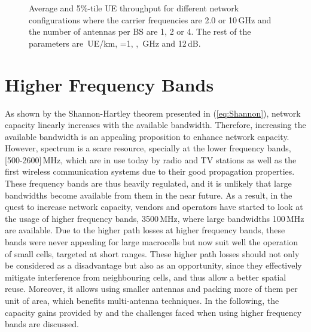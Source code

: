 \documentclass{IEEEtran}
\begin{document}
\begin{figure*}[t]
  \centering
  \caption{Average and 5\%-tile UE throughput for different network configurations where the carrier frequencies are 2.0 or 10\,GHz
  and the number of antennas per \ac{BS} are 1, 2 or 4.
  The rest of the parameters are \,UE/km, =1, , \,GHz and 12\,dB.}
  \label{fig:throughputAllAnt}
\end{figure*}



\section{Higher Frequency Bands}
\label{Sec:higherFrequecnyBands}

As shown by the Shannon-Hartley theorem presented in (\ref{eq:Shannon}),
network capacity linearly increases with the available bandwidth.
Therefore, increasing the available bandwidth is an appealing proposition to enhance network capacity.
However, spectrum is a scare resource,
specially at the lower frequency bands, [500-2600]\,MHz,
which are in use today by radio and TV stations as well as the first wireless communication systems due to their good propagation properties.
These frequency bands are thus heavily regulated,
and it is unlikely that large bandwidths become available from them in the near future.
As a result,
in the quest to increase network capacity,
vendors and operators have started to look at the usage of higher frequency bands, 3500\,MHz,
where large bandwidths 100\,MHz are available.
Due to the higher path losses at higher frequency bands,
these bands were never appealing for large macrocells but now suit well the operation of small cells,
targeted at short ranges.
These higher path losses should not only be considered as a disadvantage but also as an opportunity,
since they effectively mitigate interference from neighbouring cells,
and thus allow a better spatial reuse.
Moreover, it allows using smaller antennas and packing more of them per unit of area, which benefits multi-antenna techniques.
In the following, the capacity gains provided by and the challenges faced when using higher frequency bands are discussed.
\end{document}
